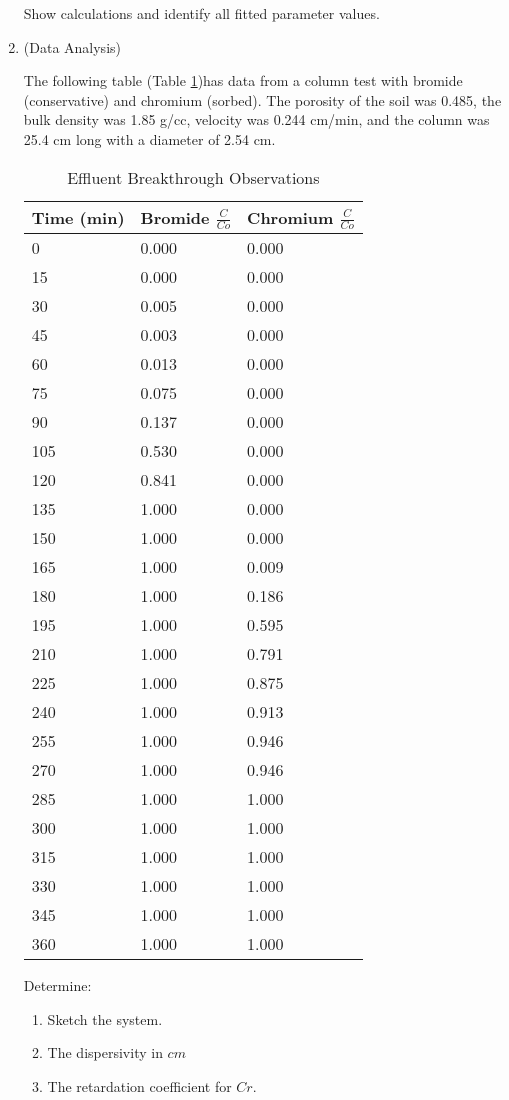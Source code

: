 \documentclass[12pt]{article}
\begin{document}
\begin{enumerate}
Show calculations and identify all fitted parameter values.
\clearpage

\item (Data Analysis)

The following table (Table \ref{tab:ColumnData})has data from a column test with bromide (conservative) and chromium (sorbed).  
The porosity of the soil was 0.485, the bulk density was 1.85 g/cc, velocity was 0.244 cm/min, and the column was 25.4 cm long with a diameter of 2.54 cm.  

\begin{table}[h!]
\centering
\caption{Effluent Breakthrough Observations}
\begin{tabular}{p{1.5in}p{1.5in}p{1.5in}} %
Time (min) & Bromide $\frac{C}{Co}$ & Chromium $\frac{C}{Co}$ \\
\hline
\hline
0&0.000&0.000\\
15&0.000&0.000\\
30&0.005&0.000\\
45&0.003&0.000\\
60&0.013&0.000\\
75&0.075&0.000\\
90&0.137&0.000\\
105&0.530&0.000\\
120&0.841&0.000\\
135&1.000&0.000\\
150&1.000&0.000\\
165&1.000&0.009\\
180&1.000&0.186\\
195&1.000&0.595\\
210&1.000&0.791\\
225&1.000&0.875\\
240&1.000&0.913\\
255&1.000&0.946\\
270&1.000&0.946\\
285&1.000&1.000\\
300&1.000&1.000\\
315&1.000&1.000\\
330&1.000&1.000\\
345&1.000&1.000\\
360&1.000&1.000\\
\hline
\end{tabular}
\label{tab:ColumnData}
\end{table}

Determine:
\begin{enumerate} %
    \item Sketch the system.
    \item The dispersivity in $cm$ 
   \item The retardation coefficient for $Cr$.
\end{enumerate} %


\end{enumerate}%
\end{document}
